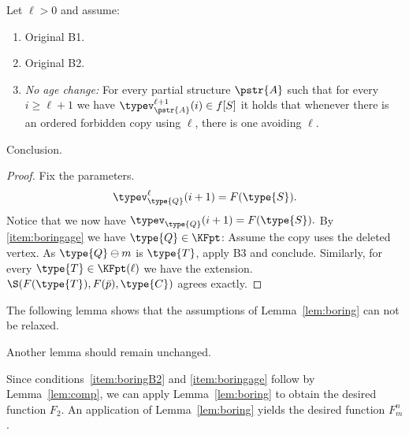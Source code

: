 \begin{lemma}
\label{lem:boring}
Let $\ell>0$ and assume:
\begin{enumerate}[label=(B\arabic*)]
\item\label{item:boringB1} Original B1.
\item\label{item:boringB2} Original B2.
\item\label{item:boringage} \emph{No age change:} For every partial structure $\pstr{A}$
such that for every $i\geq \ell+1$ we have $\typev^{\ell+1}_\pstr{A}(i)\in f[S]$
it holds that whenever there is an ordered forbidden copy using $\ell$,
there is one avoiding $\ell$.
\end{enumerate}
Conclusion.
\end{lemma}
\begin{proof}
Fix the parameters.
$$\typev_\type{Q}^\ell(i+1)=F(\type{S}).$$
Notice that we now have $\typev_\type{Q}(i+1)=F(\type{S}).$
By \ref{item:boringage} we have $\type{Q}\in\KFpt$: Assume
the copy uses the deleted vertex. As $\type{Q}\ominus m$ is $\type{T}$,
apply B3 and conclude.
Similarly, for every $\type{T}\in \KFpt(\ell)$ we have the extension.
$\S(F(\type{T}), F(\bar p), \type{C})$ agrees exactly.
\end{proof}
The following lemma shows that the assumptions of Lemma~\ref{lem:boring} can not be relaxed.
\begin{lemma}
\label{lem:comp}
Another lemma should remain unchanged.
\end{lemma}
Since conditions~\ref{item:boringB2} and \ref{item:boringage} follow by Lemma~\ref{lem:comp}, we can apply Lemma~\ref{lem:boring} to obtain the desired function $F_2$.
An application of Lemma~\ref{lem:boring} yields the desired function $F_m^n$.
